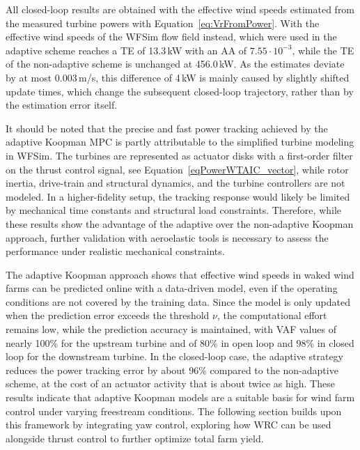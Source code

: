 All closed-loop results are obtained with the effective wind speeds estimated from the measured turbine powers with Equation~\eqref{eq:VrFromPower}. With the effective wind speeds of the WFSim flow field instead, which were used in \cite{dittmer2022data} the adaptive scheme reaches a TE of 13.3\,kW with an AA of $7.55\cdot 10^{-3}$, while the TE of the non-adaptive scheme is unchanged at 456.0\,kW. As the estimates deviate by at most 0.003\,m/s, this difference of 4\,kW is mainly caused by slightly shifted update times, which change the subsequent closed-loop trajectory, rather than by the estimation error itself.

It should be noted that the precise and fast power tracking achieved by the adaptive Koopman MPC is partly attributable to the simplified turbine modeling in WFSim. The turbines are represented as actuator disks with a first-order filter on the thrust control signal, see Equation~\eqref{eqPowerWTAIC_vector}, while rotor inertia, drive-train and structural dynamics, and the turbine controllers are not modeled. In a higher-fidelity setup, the tracking response would likely be limited by mechanical time constants and structural load constraints. Therefore, while these results show the advantage of the adaptive over the non-adaptive Koopman approach, further validation with aeroelastic tools is necessary to assess the performance under realistic mechanical constraints.

The adaptive Koopman approach shows that effective wind speeds in waked wind farms can be predicted online with a data-driven model, even if the operating conditions are not covered by the training data. Since the model is only updated when the prediction error exceeds the threshold $\nu$, the computational effort remains low, while the prediction accuracy is maintained, with VAF values of nearly 100\% for the upstream turbine and of 80\% in open loop and 98\% in closed loop for the downstream turbine. In the closed-loop case, the adaptive strategy reduces the power tracking error by about 96\% compared to the non-adaptive scheme, at the cost of an actuator activity that is about twice as high. These results indicate that adaptive Koopman models are a suitable basis for wind farm control under varying freestream conditions. The following section builds upon this framework by integrating yaw control, exploring how WRC can be used alongside thrust control to further optimize total farm yield.


